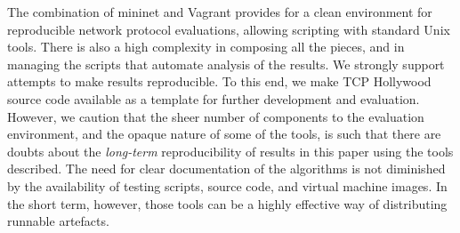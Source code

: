The combination of mininet and Vagrant provides for a clean environment for
reproducible network protocol evaluations, allowing scripting with standard Unix
tools. There is also a high complexity in composing all the pieces, and in
managing the scripts that automate analysis of the results. We strongly support
attempts to make results reproducible. To this end, we make TCP Hollywood source
code available as a template for further development and evaluation. However, we
caution that the sheer number of components to the evaluation environment, and
the opaque nature of some of the tools, is such that there are doubts about the
\emph{long-term} reproducibility of results in this paper using the tools
described. The need for clear documentation of the algorithms is not diminished
by the availability of testing scripts, source code, and virtual machine images.
In the short term, however, those tools can be a highly effective way of
distributing runnable artefacts.

